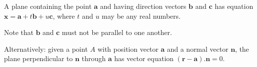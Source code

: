 \newcommand{\v}[1]{$\mathbf{#1}$}
\newcommand{\b}[1]{\mathbf{#1}}
A plane containing the point \v{a} and having direction vectors \v{b} and \v{c} has equation $\b{x}=\b{a}+t\b{b}+u\b{c}$, where $t$ and $u$ may be any real numbers.
\par
Note that \v{b} and \v{c} must not be parallel to one another.
\par
Alternatively: given a point $A$ with position vector \v{a} and a normal vector \v{n}, the plane perpendicular to \v{n} through \v{a} has vector equation $(\b{r}-\b{a}).\b{n} = 0$.

  
  